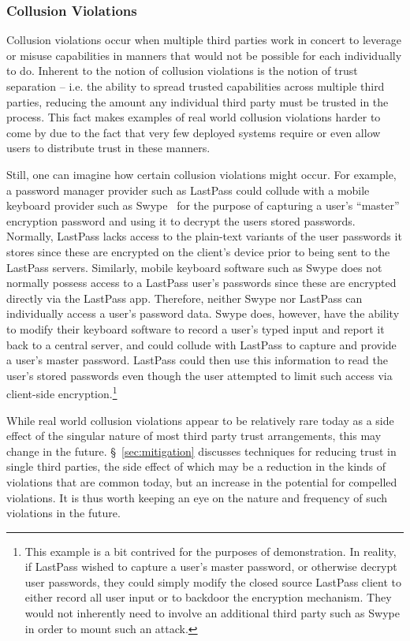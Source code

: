 \subsubsection{Collusion Violations}

Collusion violations occur when multiple third parties work in concert
to leverage or misuse capabilities in manners that would not be
possible for each individually to do. Inherent to the notion of
collusion violations is the notion of trust separation -- i.e. the
ability to spread trusted capabilities across multiple third parties,
reducing the amount any individual third party must be trusted in the
process. This fact makes examples of real world collusion violations
harder to come by due to the fact that very few deployed systems
require or even allow users to distribute trust in these manners.

Still, one can imagine how certain collusion violations might
occur. For example, a password manager provider such as LastPass could
collude with a mobile keyboard provider such as Swype~\cite{swype} for
the purpose of capturing a user's ``master'' encryption password and
using it to decrypt the users stored passwords. Normally, LastPass
lacks access to the plain-text variants of the user passwords it
stores since these are encrypted on the client's device prior to being
sent to the LastPass servers. Similarly, mobile keyboard software such
as Swype does not normally possess access to a LastPass user's
passwords since these are encrypted directly via the LastPass
app. Therefore, neither Swype nor LastPass can individually access a
user's password data. Swype does, however, have the ability to modify
their keyboard software to record a user's typed input and report it
back to a central server, and could collude with LastPass to capture
and provide a user's master password. LastPass could then use this
information to read the user's stored passwords even though the user
attempted to limit such access via client-side
encryption.\footnote{This example is a bit contrived for the purposes
  of demonstration. In reality, if LastPass wished to capture a user's
  master password, or otherwise decrypt user passwords, they could
  simply modify the closed source LastPass client to either record all
  user input or to backdoor the encryption mechanism. They would not
  inherently need to involve an additional third party such as Swype
  in order to mount such an attack.}

While real world collusion violations appear to be relatively rare
today as a side effect of the singular nature of most third party
trust arrangements, this may change in the
future. \S~\ref{sec:mitigation} discusses techniques for reducing
trust in single third parties, the side effect of which may be a
reduction in the kinds of violations that are common today, but an
increase in the potential for compelled violations. It is thus worth
keeping an eye on the nature and frequency of such violations in the
future.

